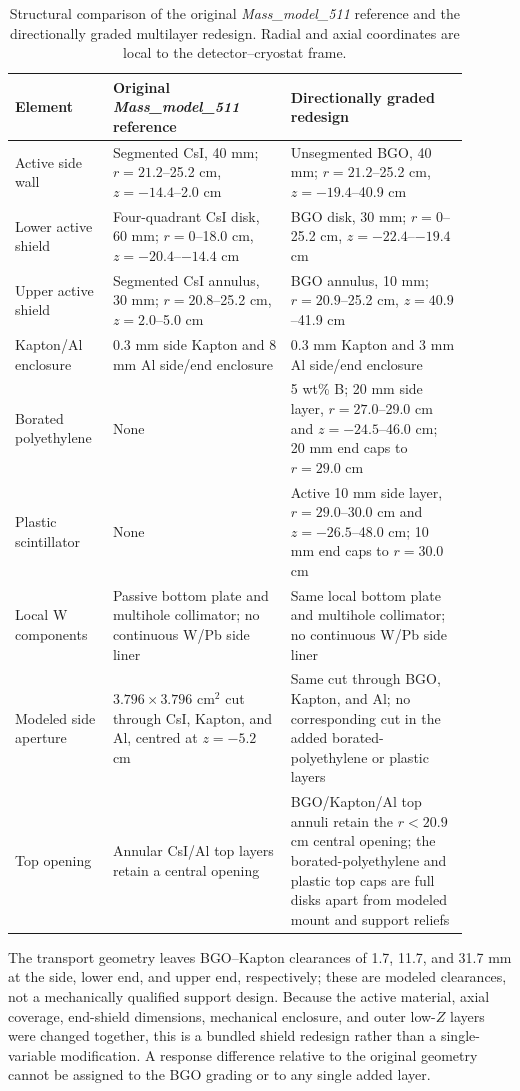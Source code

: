 \documentclass[11pt]{article}
\begin{document}
\begin{table}[!ht]
\centering
\caption{Structural comparison of the original \textit{Mass\_model\_511} reference and the directionally graded multilayer redesign. Radial and axial coordinates are local to the detector--cryostat frame.}
\label{tab:final_geometry}
\footnotesize
\begin{tabular}{p{0.18\linewidth}p{0.36\linewidth}p{0.36\linewidth}}
\toprule
Element & Original \textit{Mass\_model\_511} reference & Directionally graded redesign \\
\midrule
Active side wall & Segmented CsI, 40 mm; $r=21.2$--25.2 cm, $z=-14.4$--2.0 cm & Unsegmented BGO, 40 mm; $r=21.2$--25.2 cm, $z=-19.4$--40.9 cm \\
Lower active shield & Four-quadrant CsI disk, 60 mm; $r=0$--18.0 cm, $z=-20.4$--$-14.4$ cm & BGO disk, 30 mm; $r=0$--25.2 cm, $z=-22.4$--$-19.4$ cm \\
Upper active shield & Segmented CsI annulus, 30 mm; $r=20.8$--25.2 cm, $z=2.0$--5.0 cm & BGO annulus, 10 mm; $r=20.9$--25.2 cm, $z=40.9$--41.9 cm \\
Kapton/Al enclosure & 0.3 mm side Kapton and 8 mm Al side/end enclosure & 0.3 mm Kapton and 3 mm Al side/end enclosure \\
Borated polyethylene & None & 5 wt\% B; 20 mm side layer, $r=27.0$--29.0 cm and $z=-24.5$--46.0 cm; 20 mm end caps to $r=29.0$ cm \\
Plastic scintillator & None & Active 10 mm side layer, $r=29.0$--30.0 cm and $z=-26.5$--48.0 cm; 10 mm end caps to $r=30.0$ cm \\
Local W components & Passive bottom plate and multihole collimator; no continuous W/Pb side liner & Same local bottom plate and multihole collimator; no continuous W/Pb side liner \\
Modeled side aperture & $3.796\times3.796$ cm$^2$ cut through CsI, Kapton, and Al, centred at $z=-5.2$ cm & Same cut through BGO, Kapton, and Al; no corresponding cut in the added borated-polyethylene or plastic layers \\
Top opening & Annular CsI/Al top layers retain a central opening & BGO/Kapton/Al top annuli retain the $r<20.9$ cm central opening; the borated-polyethylene and plastic top caps are full disks apart from modeled mount and support reliefs \\
\bottomrule
\end{tabular}
\end{table}

The transport geometry leaves BGO--Kapton clearances of 1.7, 11.7, and 31.7 mm
at the side, lower end, and upper end, respectively; these are modeled clearances,
not a mechanically qualified support design. Because the active material, axial
coverage, end-shield dimensions, mechanical
enclosure, and outer low-$Z$ layers were changed together, this is a bundled
shield redesign rather than a single-variable modification. A response difference
relative to the original geometry cannot be assigned to the BGO grading or to any
single added layer.
\end{document}

